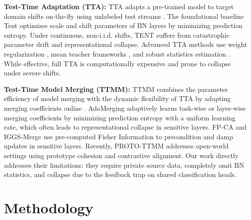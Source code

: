 \documentclass{article}
\theoremstyle{plain}
\theoremstyle{definition}
\theoremstyle{remark}
\begin{document}
\textbf{Test-Time Adaptation (TTA):} TTA adapts a pre-trained model to target domain shifts
on-the-fly using unlabeled test streams \cite{Liang2023, Sun2020}. The foundational baseline Tent
\cite{Wang2021} optimizes scale and shift parameters of BN layers by minimizing prediction entropy.
Under continuous, non-i.i.d. shifts, TENT suffers from catastrophic parameter drift and
representational collapse. Advanced TTA methods use weight regularization \cite{Niu2022}, mean
teacher frameworks \cite{Wang2022}, and robust statistics estimation \cite{Yuan2023}. While
effective, full TTA is computationally expensive and prone to collapse under severe shifts.

\textbf{Test-Time Model Merging (TTMM):} TTMM combines the parameter efficiency of model merging
with the dynamic flexibility of TTA by adapting merging coefficients online \cite{Yang2024,
Zhao2024}. AdaMerging \cite{Yang2023, Yang2024} adaptively learns task-wise or layer-wise merging
coefficients by minimizing prediction entropy with a uniform learning rate, which often leads to
representational collapse in sensitive layers. FP-CA \cite{Luan2026} and IGGS-Merge
\cite{IGGSMerge2026} use pre-computed Fisher Information to precondition and damp updates in
sensitive layers. Recently, PROTO-TTMM \cite{ProtoTTMM2026} addresses open-world settings using
prototype cohesion and contrastive alignment. Our work directly addresses their limitations: they
require private source data, completely omit BN statistics, and collapse due to the feedback trap on
shared classification heads.

\section{Methodology}\vspace{-0.1in}
\label{sec:methodology}
\end{document}
